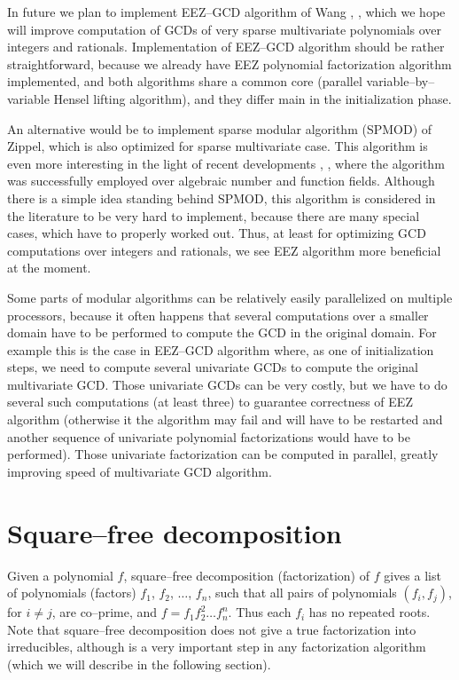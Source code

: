In future we plan to implement EEZ--GCD algorithm of Wang \cite{Wang1980eezgcd}, \cite{Moses1973ezgcd},
which we hope will improve computation of GCDs of very sparse multivariate polynomials over
integers and rationals. Implementation of EEZ--GCD algorithm should be rather straightforward,
because we already have EEZ polynomial factorization algorithm implemented, and both algorithms
share a common core (parallel variable--by--variable Hensel lifting algorithm), and they differ
main in the initialization phase.

An alternative would be to implement sparse modular algorithm (SPMOD) of Zippel, which is also
optimized for sparse multivariate case. This algorithm is even more interesting in the light
of recent developments \cite{Monagan2004algebraic}, \cite{Javadi2007spmod}, where the algorithm was
successfully employed over algebraic number and function fields. Although there is a simple
idea standing behind SPMOD, this algorithm is considered in the literature to be very hard
to implement, because there are many special cases, which have to properly worked out. Thus,
at least for optimizing GCD computations over integers and rationals, we see EEZ algorithm
more beneficial at the moment.

Some parts of modular algorithms can be relatively easily parallelized on multiple processors,
because it often happens that several computations over a smaller domain have to be performed
to compute the GCD in the original domain. For example this is the case in EEZ--GCD algorithm
where, as one of initialization steps, we need to compute several univariate GCDs to compute
the original multivariate GCD. Those univariate GCDs can be very costly, but we have to do
several such computations (at least three) to guarantee correctness of EEZ algorithm (otherwise
it the algorithm may fail and will have to be restarted and another sequence of univariate
polynomial factorizations would have to be performed). Those univariate factorization can
be computed in parallel, greatly improving speed of multivariate GCD algorithm.


\section{Square--free decomposition}

Given a polynomial $f$, square--free decomposition (factorization) of $f$ gives a list of
polynomials (factors) $f_1$, $f_2$, $\ldots$, $f_n$, such that all pairs of polynomials
$(f_i, f_j)$, for $i \not= j$, are co--prime, and $f = f_1 f_2^2 \ldots f_n^n$. Thus each
$f_i$ has no repeated roots. Note that square--free decomposition does not give a true
factorization into irreducibles, although is a very important step in any factorization
algorithm (which we will describe in the following section).

